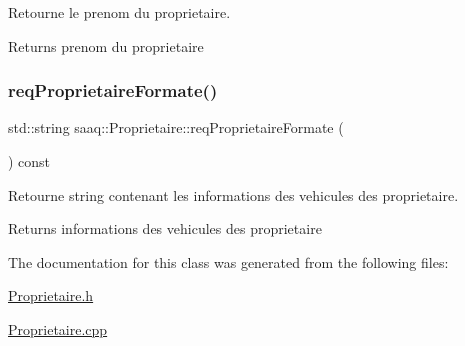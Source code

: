 Retourne le prenom du proprietaire. 

\begin{DoxyReturn}{Returns}
prenom du proprietaire 
\end{DoxyReturn}
\mbox{\label{classsaaq_1_1Proprietaire_a808b18e9e9a6b1d3b7f24e78769c0474}} 
\subsubsection{\texorpdfstring{req\+Proprietaire\+Formate()}{reqProprietaireFormate()}}
{\footnotesize\ttfamily std\+::string saaq\+::\+Proprietaire\+::req\+Proprietaire\+Formate (\begin{DoxyParamCaption}{ }\end{DoxyParamCaption}) const}



Retourne string contenant les informations des vehicules des proprietaire. 

\begin{DoxyReturn}{Returns}
informations des vehicules des proprietaire 
\end{DoxyReturn}


The documentation for this class was generated from the following files\+:\begin{DoxyCompactItemize}
\item 
\hyperlink{Proprietaire_8h}{Proprietaire.\+h}\item 
\hyperlink{Proprietaire_8cpp}{Proprietaire.\+cpp}\end{DoxyCompactItemize}
